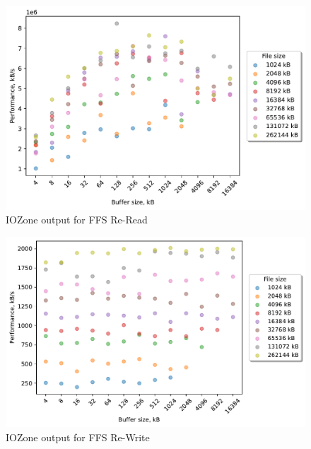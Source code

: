 \begin{figure}[!htb]
	\label{fig:bench_ffs_re_read}
	\begin{center}
		\includegraphics[width=1.0\textwidth]{figures/benchmarking/ffs/Re-Read.pdf}
	\end{center}
	\caption{IOZone output for FFS \mbox{Re-Read}}
\end{figure}

\begin{figure}[!htb]
	\label{fig:bench_ffs_re_write}
	\begin{center}
		\includegraphics[width=1.0\textwidth]{figures/benchmarking/ffs/Re-Write.pdf}
	\end{center}
	\caption{IOZone output for FFS \mbox{Re-Write}}
\end{figure}

